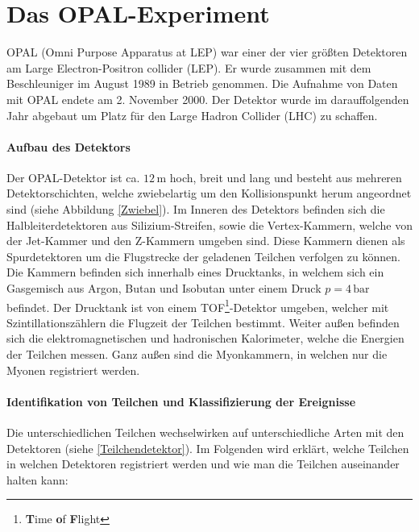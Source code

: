 \section{Das OPAL-Experiment}

OPAL (Omni Purpose Apparatus at LEP) war einer der vier größten Detektoren am Large Electron-Positron collider (LEP). Er wurde zusammen mit dem Beschleuniger im August 1989 in Betrieb genommen. Die Aufnahme von Daten mit OPAL endete am 2. November 2000. Der Detektor wurde im darauffolgenden Jahr abgebaut um Platz für den Large Hadron Collider (LHC) zu schaffen.\\


 

\paragraph{Aufbau des Detektors}
Der OPAL-Detektor ist ca. $12\,\mathrm{m}$ hoch, breit und lang und besteht aus mehreren Detektorschichten, welche zwiebelartig um den Kollisionspunkt herum angeordnet sind (siehe Abbildung \ref{Zwiebel}). Im Inneren des Detektors befinden sich die Halbleiterdetektoren aus Silizium-Streifen, sowie die Vertex-Kammern, welche von der Jet-Kammer und den Z-Kammern umgeben sind. Diese Kammern dienen als Spurdetektoren um die Flugstrecke der geladenen Teilchen verfolgen zu können. Die Kammern befinden sich innerhalb eines Drucktanks, in welchem sich ein Gasgemisch aus Argon, Butan und Isobutan unter einem Druck $p=4\,\mathrm{bar}$ befindet. Der Drucktank ist von einem TOF\footnote{\textbf Time \textbf of \textbf Flight}-Detektor umgeben, welcher mit Szintillationszählern die Flugzeit der Teilchen bestimmt. Weiter außen befinden sich die elektromagnetischen und hadronischen Kalorimeter, welche die Energien der Teilchen messen. Ganz außen sind die Myonkammern, in welchen nur die Myonen registriert werden. \cite{anleitungalt}

\paragraph{Identifikation von Teilchen und Klassifizierung der Ereignisse}
 
 Die unterschiedlichen Teilchen wechselwirken auf unterschiedliche Arten mit den Detektoren (siehe 
\ref{Teilchendetektor}). Im Folgenden wird erklärt, welche Teilchen in welchen Detektoren registriert werden und wie man die Teilchen auseinander halten kann:

